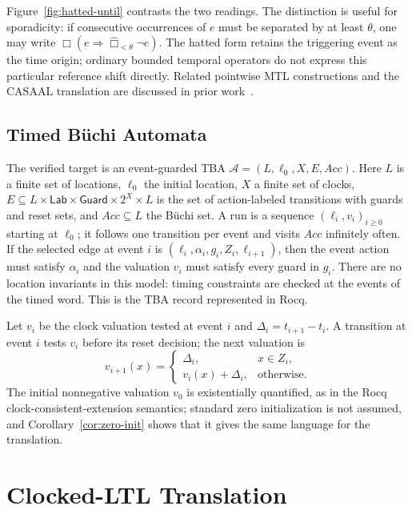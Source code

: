 \documentclass[manuscript]{acmart}
\begin{document}
Figure~\ref{fig:hatted-until} contrasts the two readings. The distinction is
useful for sporadicity: if consecutive occurrences of
$e$ must be separated by at least $\theta$, one may write
$\Box(e\Rightarrow\widehat{\Box}_{<\theta}\neg e)$. The hatted form retains
the triggering event as the time origin; ordinary bounded temporal
operators do not express this particular reference shift directly.
Related pointwise MTL constructions and the CASAAL translation are discussed
in prior work~\cite{ouaknine_worrell_lics05,bouyer_chevalier_markey_fsttcs05,li_spin7,casaal_tool}.

\subsection{Timed B\"uchi Automata}
\label{sec:tba}
The verified target is an event-guarded TBA
$\mathcal A=(L,\ell_0,X,E,\mathit{Acc})$. Here $L$ is a finite set of
locations, $\ell_0$ the initial location, $X$ a finite set of clocks,
$E\subseteq L\times\mathsf{Lab}\times\mathsf{Guard}\times 2^X\times L$
is the set of action-labeled transitions with guards and reset sets, and
$\mathit{Acc}\subseteq L$ the B\"uchi set. A run is a sequence
$(\ell_i,v_i)_{i\ge0}$ starting at $\ell_0$; it follows one transition per
event and visits $\mathit{Acc}$ infinitely often. If the selected edge at
event $i$ is $(\ell_i,\alpha_i,g_i,Z_i,\ell_{i+1})$, then the event action
must satisfy $\alpha_i$ and the valuation $v_i$ must satisfy every guard in
$g_i$. There are no location invariants in this model: timing constraints
are checked at the events of the timed word. This is the TBA record
represented in Rocq.

Let $v_i$ be the clock valuation tested at event $i$ and
$\Delta_i=t_{i+1}-t_i$. A transition at event $i$ tests $v_i$ before its
reset decision; the next valuation is
\[
v_{i+1}(x)=
\begin{cases}
\Delta_i,&x\in Z_i,\\
v_i(x)+\Delta_i,&\text{otherwise.}
\end{cases}
\]
The initial nonnegative valuation $v_0$ is existentially quantified, as in
the Rocq clock-consistent-extension semantics; standard zero initialization
is not assumed, and Corollary~\ref{cor:zero-init} shows that it gives the same
language for the translation.

\section{Clocked-LTL Translation}
\label{sec:translation}
\end{document}
